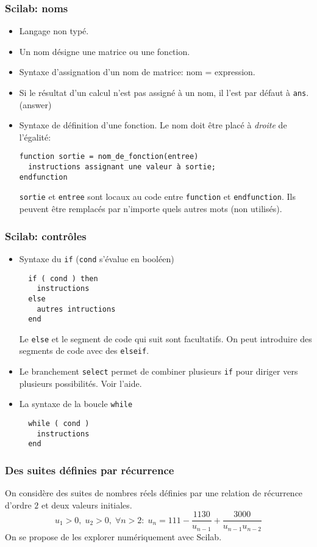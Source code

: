 \begin{frame}[fragile]
  \frametitle{Scilab: noms}
\begin{itemize}
  \item Langage non typé.
  \item Un nom désigne une matrice ou une fonction.
  \item Syntaxe d'assignation d'un nom de matrice: nom = expression.
  \item Si le résultat d'un calcul n'est pas assigné à un nom, il l'est par défaut à \texttt{ans}. (answer)
  \item Syntaxe de définition d'une fonction. Le nom doit être placé à \emph{droite} de l'égalité:
\begin{verbatim}
function sortie = nom_de_fonction(entree)
  instructions assignant une valeur à sortie;
endfunction
\end{verbatim}
\texttt{sortie} et \texttt{entree} sont locaux au code entre \texttt{function} et \texttt{endfunction}. Ils peuvent être remplacés par n'importe quels autres mots (non utilisés).
\end{itemize}
\end{frame}

\begin{frame}[fragile]
  \frametitle{Scilab: contrôles}
\begin{itemize}
  \item Syntaxe du \texttt{if} (\texttt{cond} s'évalue en booléen)
\begin{verbatim}
  if ( cond ) then
    instructions
  else
    autres intructions
  end
\end{verbatim}
Le \texttt{else} et le segment de code qui suit sont facultatifs. On peut introduire des segments de code avec des \texttt{elseif}.

\item Le branchement \texttt{select} permet de combiner plusieurs \texttt{if} pour diriger vers plusieurs possibilités. Voir l'aide.

\item La syntaxe de la boucle \texttt{while} 
\begin{verbatim}
  while ( cond )
    instructions
  end
\end{verbatim}
\end{itemize}
\end{frame}

\begin{frame}
  \frametitle{Des suites définies par récurrence}
On considère des suites de nombres réels définies par une relation de récurrence d'ordre $2$ et deux valeurs initiales.
\begin{displaymath}
  u_1>0,\; u_2>0,\;
  \forall n>2:\;
  u_{n}= 111 - \frac{1130}{u_{n-1}} + \frac{3000}{u_{n-1}u_{n-2}}
\end{displaymath}
On se propose de les explorer numériquement avec Scilab.
\end{frame}

